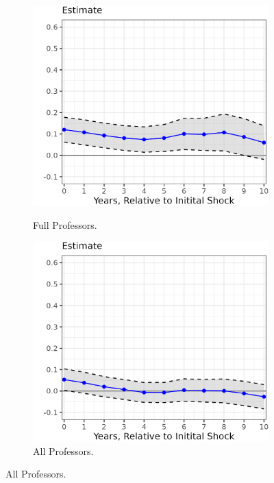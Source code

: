 \begin{figure}[H]
\begin{subfigure}[b]{0.495\textwidth}
        \label{fig:assistant-count-lp}
    \end{subfigure}
    \begin{subfigure}[b]{0.495\textwidth}
        \centering
        \caption{Full Professors.}
        \includegraphics[width=\textwidth]{figures/full-count-lp.png}
        \label{fig:full-count-lp}
    \end{subfigure}
    \begin{subfigure}[b]{0.495\textwidth}
        \centering
        \caption{All Professors.}
        \includegraphics[width=\textwidth]{figures/all-count-lp.png}

\end{subfigure}
\end{figure}
